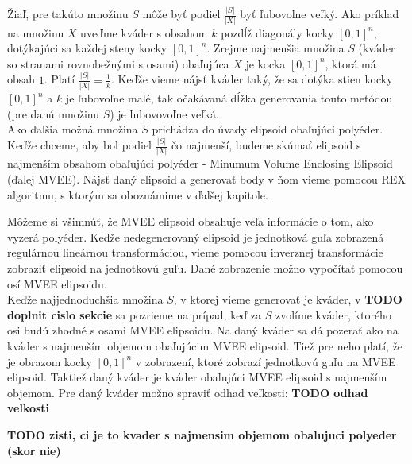 Žiaľ, pre takúto množinu $S$ môže byť podiel $\frac{|S|}{|X|}$ byť ľubovoľne veľký. Ako príklad na množinu $X$ uveďme kváder s obsahom $k$ pozdĺž diagonály kocky $[0,1]^n$, dotýkajúci sa každej steny kocky $[0,1]^n$. Zrejme najmenšia množina $S$ (kváder so stranami rovnobežnými s osami) obaľujúca $X$ je kocka $[0,1]^n$, ktorá má obsah $1$. Platí $\frac{|S|}{|X|}=\frac{1}{k}$. Keďže vieme nájsť kváder taký, že sa dotýka stien kocky $[0,1]^n$ a $k$ je ľubovoľne malé, tak očakávaná dĺžka generovania touto metódou (pre danú množinu $S$) je ľubovovoľne veľká.\\

Ako ďalšia možná množina $S$ prichádza do úvady elipsoid obaľujúci polyéder. Keďže chceme, aby bol podiel $\frac{|S|}{|X|}$ čo najmenší, budeme skúmať elipsoid s najmenším obsahom obaľujúci polyéder - Minumum Volume Enclosing Elipsoid (ďalej MVEE). Nájsť daný elipsoid a generovať body v ňom vieme pomocou REX algoritmu, s ktorým sa oboznámime v ďalšej kapitole.

Môžeme si všimnúť, že MVEE elipsoid obsahuje veľa informácie o tom, ako vyzerá polyéder. Keďže nedegenerovaný elipsoid je jednotková guľa zobrazená regulárnou lineárnou transformáciou, vieme pomocou inverznej transformácie zobraziť elipsoid na jednotkovú guľu. Dané zobrazenie možno vypočítať pomocou osí MVEE elipsoidu.\\

Keďže najjednoduchšia množina $S$, v ktorej vieme generovať je kváder, v \textbf{TODO doplnit cislo sekcie} sa pozrieme na prípad, keď za $S$ zvolíme kváder, ktorého osi budú zhodné s osami MVEE elipsoidu. Na daný kváder sa dá pozerať ako na kváder s najmenším objemom obaľujúcim MVEE elipsoid. Tiež pre neho platí, že je obrazom kocky $[0,1]^n$ v zobrazení, ktoré zobrazí jednotkovú guľu na MVEE elipsoid. Taktiež daný kváder je kváder obaľujúci MVEE elipsoid s najmenším objemom. Pre daný kváder možno spraviť odhad veľkosti:
\textbf{TODO odhad velkosti}

\textbf{TODO zisti, ci je to kvader s najmensim objemom obalujuci polyeder (skor nie)}



